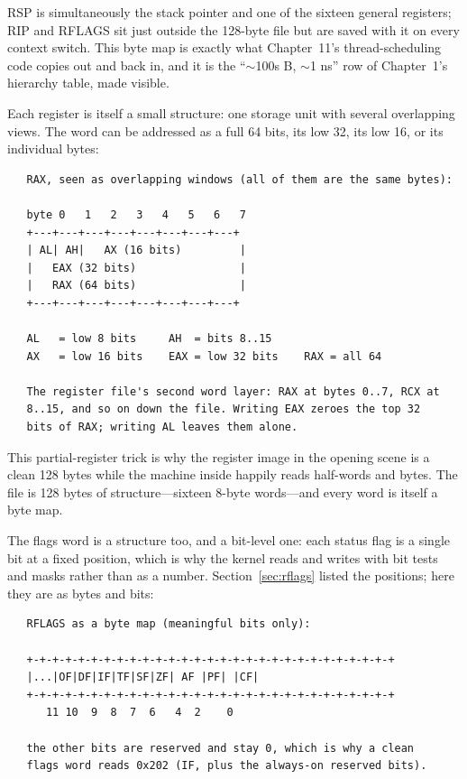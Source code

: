RSP is simultaneously the stack pointer and one of the sixteen
general registers; RIP and RFLAGS sit just outside the 128-byte file
but are saved with it on every context switch. This byte map is
exactly what Chapter~11's thread-scheduling code copies out and back
in, and it is the ``$\sim$100s B, $\sim$1 ns'' row of Chapter~1's
hierarchy table, made visible.

Each register is itself a small structure: one storage unit with
several overlapping views. The  word can be addressed as a
full 64 bits, its low 32, its low 16, or its individual bytes:

\begin{verbatim}
   RAX, seen as overlapping windows (all of them are the same bytes):

   byte 0   1   2   3   4   5   6   7
   +---+---+---+---+---+---+---+---+
   | AL| AH|   AX (16 bits)         |
   |   EAX (32 bits)                |
   |   RAX (64 bits)                |
   +---+---+---+---+---+---+---+---+

   AL   = low 8 bits     AH  = bits 8..15
   AX   = low 16 bits    EAX = low 32 bits    RAX = all 64

   The register file's second word layer: RAX at bytes 0..7, RCX at
   8..15, and so on down the file. Writing EAX zeroes the top 32
   bits of RAX; writing AL leaves them alone.
\end{verbatim}

This partial-register trick is why the register image in the opening
scene is a clean 128 bytes while the machine inside happily reads
half-words and bytes. The file is 128 bytes of structure---sixteen
8-byte words---and every word is itself a byte map.

The flags word is a structure too, and a bit-level one: each status
flag is a single bit at a fixed position, which is why the kernel
reads and writes  with bit tests and masks rather than
as a number. Section~\ref{sec:rflags} listed the positions; here they
are as bytes and bits:

\begin{verbatim}
   RFLAGS as a byte map (meaningful bits only):

   +-+-+-+-+-+-+-+-+-+-+-+-+-+-+-+-+-+-+-+-+-+-+-+-+-+-+-+-+
   |...|OF|DF|IF|TF|SF|ZF| AF |PF| |CF|
   +-+-+-+-+-+-+-+-+-+-+-+-+-+-+-+-+-+-+-+-+-+-+-+-+-+-+-+-+
      11 10  9  8  7  6   4  2    0

   the other bits are reserved and stay 0, which is why a clean
   flags word reads 0x202 (IF, plus the always-on reserved bits).
\end{verbatim}

